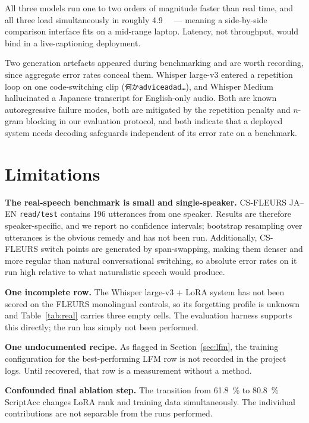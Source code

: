 \documentclass[11pt,a4paper]{article}
\begin{document}
All three models run one to two orders of magnitude faster than real time, and all
three load simultaneously in roughly \SI{4.9}{\giga\byte} --- meaning a
side-by-side comparison interface fits on a mid-range laptop. Latency, not
throughput, would bind in a live-captioning deployment.

Two generation artefacts appeared during benchmarking and are worth recording,
since aggregate error rates conceal them. Whisper large-v3 entered a repetition
loop on one code-switching clip (\texttt{何かadviceadad\ldots}), and Whisper
Medium hallucinated a Japanese transcript for English-only audio. Both are known
autoregressive failure modes, both are mitigated by the repetition penalty and
$n$-gram blocking in our evaluation protocol, and both indicate that a deployed
system needs decoding safeguards independent of its error rate on a benchmark.

\section{Limitations}
\label{sec:limitations}

\textbf{The real-speech benchmark is small and single-speaker.} CS-FLEURS
JA--EN \texttt{read/test} contains 196 utterances from one speaker. Results are
therefore speaker-specific, and we report no confidence intervals; bootstrap
resampling over utterances is the obvious remedy and has not been run.
Additionally, CS-FLEURS switch points are generated by span-swapping, making them
denser and more regular than natural conversational switching, so absolute error
rates on it run high relative to what naturalistic speech would produce.

\textbf{One incomplete row.} The Whisper large-v3 + LoRA system has not been
scored on the FLEURS monolingual controls, so its forgetting profile is unknown
and Table~\ref{tab:real} carries three empty cells. The evaluation harness
supports this directly; the run has simply not been performed.

\textbf{One undocumented recipe.} As flagged in Section~\ref{sec:lfm}, the
training configuration for the best-performing LFM row is not recorded in the
project logs. Until recovered, that row is a measurement without a method.

\textbf{Confounded final ablation step.} The transition from \SI{61.8}{\percent}
to \SI{80.8}{\percent} ScriptAcc changes LoRA rank and training data
simultaneously. The individual contributions are not separable from the runs
performed.
\end{document}
